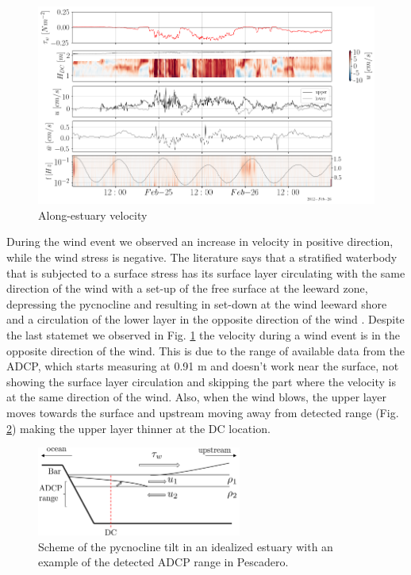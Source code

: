 \documentclass[tesis.tex]{subfiles}
\begin{document}
\begin{figure}[h!]
    \centering
    \includegraphics[width=\textwidth]{Imagenes/vel_wind.png}
    \caption{Along-estuary velocity }
    \label{fig:velwind}
\end{figure}

During the wind event we observed an increase in velocity in positive direction, while the wind stress is negative. The literature says that a stratified waterbody that is subjected to a surface stress has its surface layer circulating with the same direction of the wind with a set-up of the free surface at the leeward zone, depressing the pycnocline and resulting in set-down at the wind leeward shore and a circulation of the lower layer in the opposite direction of the wind \citep{Katopodes2018}. Despite the last statemet we observed in Fig. \ref{fig:velwind} the velocity during a wind event is in the opposite direction of the wind. This is due to the range of available data from the ADCP, which starts measuring at 0.91 m and doesn't work near the surface, not showing the surface layer circulation and skipping the part where the velocity is at the same direction of the wind. Also, when the wind blows, the upper layer moves towards the surface and upstream moving away from detected range (Fig. \ref{fig:adcp}) making the upper layer thinner at the DC location.\\

\begin{figure}[h!]
    \centering
    \includegraphics[width=0.6\textwidth]{Imagenes/ADCP_range.png}
    \caption{Scheme of the pycnocline tilt in an idealized estuary with an example of the detected ADCP range in Pescadero.}
    \label{fig:adcp}
\end{figure}
\end{document}
